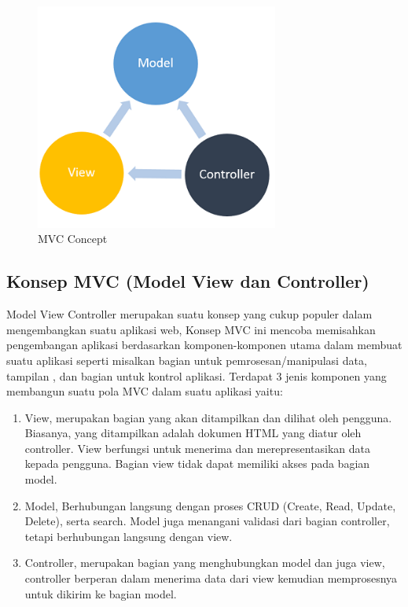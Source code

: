 \begin{enumerate}
	\begin{figure}[H]
		\includegraphics[width=8cm]{figures/web/mvc.png}
		\centering
		\caption{MVC Concept}
	\end{figure}
\subsection{Konsep MVC (Model View dan Controller)}
Model View Controller merupakan suatu konsep yang cukup populer dalam mengembangkan suatu aplikasi web, Konsep MVC ini mencoba memisahkan pengembangan aplikasi berdasarkan komponen-komponen utama dalam membuat suatu aplikasi seperti misalkan bagian untuk pemrosesan/manipulasi data, tampilan , dan bagian untuk kontrol aplikasi. Terdapat 3 jenis komponen yang membangun suatu pola MVC dalam suatu aplikasi yaitu: 
\begin{enumerate}
	\item View, merupakan bagian yang akan ditampilkan dan dilihat oleh pengguna. Biasanya, yang ditampilkan adalah dokumen HTML yang diatur oleh controller. View berfungsi untuk menerima dan merepresentasikan data kepada pengguna. Bagian view tidak dapat memiliki akses pada bagian model.
	\item Model, Berhubungan langsung dengan proses CRUD (Create, Read, Update, Delete), serta search. Model juga menangani validasi dari bagian controller, tetapi berhubungan langsung dengan view.
	\item Controller, merupakan bagian yang menghubungkan model dan juga view, controller berperan dalam menerima data dari view kemudian memprosesnya untuk dikirim ke bagian model.
\end{enumerate}


\end{enumerate}
